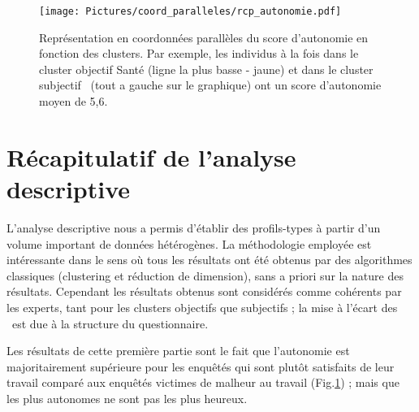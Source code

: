 \documentclass[11pt,fleqn,openany,frenchb]{book} %
\begin{document}

\begin{figure}[!h]
\centering
\texttt{[image: Pictures/coord\_paralleles/rcp\_autonomie.pdf]}
\caption{Représentation en coordonnées parallèles du score d'autonomie en fonction des clusters. Par exemple, les individus à la fois dans le cluster objectif Santé (ligne la plus basse - jaune) et dans le cluster subjectif \HEUR\ (tout a gauche sur le graphique) ont un score d'autonomie moyen de 5,6.}
\label{fig:rcpautonomie}
\end{figure}

\section{Récapitulatif de l'analyse descriptive}
L'analyse descriptive nous a permis d'établir des profils-types à partir d'un volume important de données hétérogènes. La méthodologie employée est intéressante dans le sens où tous les résultats ont été obtenus par des algorithmes classiques (clustering et réduction de dimension), sans a priori sur la nature des résultats. Cependant les résultats obtenus sont considérés comme cohérents par les experts, tant pour les clusters objectifs que subjectifs ; la mise à l'écart des \INDEP\ est due à la structure du questionnaire. \par	

Les résultats de cette première partie sont le fait que l'autonomie est majoritairement supérieure pour les enquêtés qui sont plutôt satisfaits de leur travail comparé aux enquêtés victimes de malheur au travail (Fig.\ref{fig:rcpautonomie}) ; mais que les plus autonomes ne sont pas les plus heureux.
\end{document}
